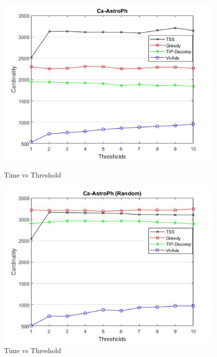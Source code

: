\begin{figure}[h!]
\begin{minipage}[t]{0.50\textwidth}
\includegraphics[width=\linewidth,keepaspectratio=true]{images/ca-astrophtime.jpg}
\caption{Time vs Threshold}
\label{fase1}
\end{minipage}
\begin{minipage}[t]{0.50\textwidth}
\includegraphics[width=\linewidth,keepaspectratio=true]{images/ca-astrophtimerandom.jpg}
\caption{Time vs Threshold}
\end{minipage}
\end{figure}


